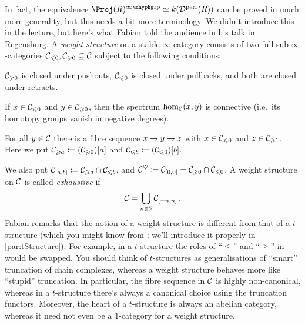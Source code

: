 \documentclass[a4paper, 10pt, oneside, DIV=9, chapterprefix=true, numbers=enddot,bibliography=totoc]{scrbook}
\begin{document}
In fact, the equivalence $\Proj(R)^\inftygrp\simeq k(\Dd^\perf(R))$ can be proved in much more generality, but this needs a bit more terminology.
\label{par:WeightStructure}
We didn't introduce this in the lecture, but here's what Fabian told the audience in his talk in Regensburg. A \emph{weight structure} on a stable $\infty$-category consists of two full sub-$\infty$-categories $\mathcal{C}_{\leqslant 0},\mathcal{C}_{\geqslant 0}\subseteq \mathcal{C}$ subject to the following conditions:
\begin{alphanumerate}
	\item $\mathcal{C}_{\geqslant 0}$ is closed under pushouts, $\mathcal{C}_{\leqslant 0}$ is closed under pullbacks, and both are closed under retracts.
	\item If $x\in \mathcal{C}_{\leqslant 0}$ and $y\in \mathcal{C}_{\geqslant 0}$, then the spectrum $\hom_{\mathcal{C}}(x,y)$ is connective (i.e.\ its homotopy groups vanish in negative degrees).
	\item For all $y\in \mathcal{C}$ there is a fibre sequence $x\morphism y\morphism z$ with $x\in \mathcal{C}_{\leqslant 0}$ and $z\in \mathcal{C}_{\geqslant 1}$. Here we put $\mathcal{C}_{\geqslant a}\coloneqq (\mathcal{C}_{\geqslant 0})[a]$ and $\mathcal{C}_{\leqslant b}\coloneqq (\mathcal{C}_{\leqslant 0})[b]$.
\end{alphanumerate}
We also put $\mathcal{C}_{[a,b]}\coloneqq \mathcal{C}_{\geqslant a}\cap \mathcal{C}_{\leqslant b}$, and $\mathcal{C}^\heartsuit\coloneqq \mathcal{C}_{[0,0]}=\mathcal{C}_{\geqslant 0}\cap \mathcal{C}_{\leqslant 0}$. A weight structure on $\mathcal{C}$ is called \emph{exhaustive} if
\begin{equation*}
	\mathcal{C}=\bigcup_{n\in\mathbb{N}}\mathcal{C}_{[-n,n]}\,.
\end{equation*}
Fabian remarks that the notion of a weight structure is different from that of a $t$-structure (which you might know from \cite[Definition~]{HA}; we'll introduce it properly in \cref{par:tStructure}). For example, in a $t$-structure the roles of \enquote{$\leq$} and \enquote{$\geq$} in  would be swapped. You should think of $t$-structures as generalisations of \enquote{smart} truncation of chain complexes, whereas a weight structure behaves more like \enquote{stupid} truncation. In particular, the fibre sequence in $\mathcal{C}$ is highly non-canonical, whereas in a $t$-structure there's always a canonical choice using the truncation functors. Moreover, the heart of a $t$-structure is always an abelian category, whereas it need not even be a $1$-category for a weight structure.
\end{document}
